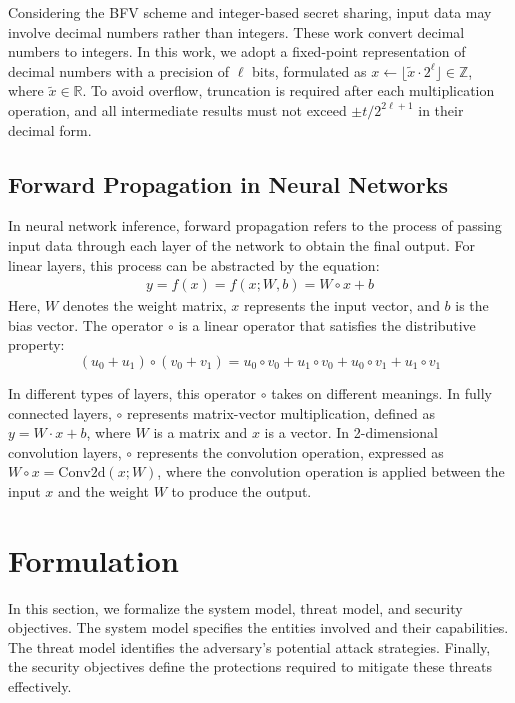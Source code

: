 \documentclass[conference]{IEEEtran}
\begin{document}
Considering the BFV scheme and integer-based secret sharing, input data may involve decimal numbers rather than integers. These work \cite{liu2024pencilprivateextensiblecollaborative,8611203} convert decimal numbers to integers. In this work, we adopt a fixed-point representation of decimal numbers with a precision of $\ell$ bits, formulated as $x \gets \lfloor \tilde{x} \cdot 2^\ell \rfloor \in \mathbb{Z}$, where $\tilde{x} \in \mathbb{R}$. To avoid overflow, truncation is required after each multiplication operation, and all intermediate results must not exceed $\pm t/2^{2\ell + 1}$ in their decimal form.

\subsection{Forward Propagation in Neural Networks}

In neural network inference, forward propagation refers to the process of passing input data through each layer of the network to obtain the final output. For linear layers, this process can be abstracted by the equation:
\begin{equation*}
\begin{array}{c}
       y=f(x)=f(x;W,b)=W\circ x+b
\end{array}
\end{equation*}
Here, $W$ denotes the weight matrix, $x$ represents the input vector, and $b$ is the bias vector. The operator $\circ$ is a linear operator that satisfies the distributive property:
\begin{equation*}
       (u_0+u_1) \circ (v_0+v_1)=u_0 \circ v_0+u_1 \circ v_0+ u_0\circ v_1+ u_1\circ v_1
\end{equation*}

In different types of layers, this operator $\circ$ takes on different meanings. In fully connected layers, $\circ$ represents matrix-vector multiplication, defined as $y=W·x+b$, where $W$ is a matrix and $x$ is a vector. In 2-dimensional convolution layers, $\circ$ represents the convolution operation, expressed as $W\circ x=\text{Conv}2\text{d}(x;W)$, where the convolution operation is applied between the input $x$ and the weight $W$ to produce the output.

\section{Formulation}
In this section, we formalize the system model, threat model, and security objectives. The system model specifies the entities involved and their capabilities. The threat model identifies the adversary's potential attack strategies. Finally, the security objectives define the protections required to mitigate these threats effectively.
\end{document}
